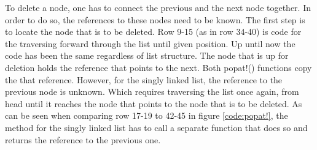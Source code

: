 \documentclass[a4paper, 11pt]{article}
\begin{document}
    To delete a node, one has to connect the previous and the next node together. In order 
    to do so, the references to these nodes need to be known. The first step is
    to locate the node that is to be deleted. Row 9-15 (as in row 34-40) is code
    for the traversing forward through the list until given position.
    Up until now the code has been the same regardless of list structure. The node that is up for deletion 
    holds the reference that points to the next. Both popat!() functions copy the that reference. 
    However, for the singly linked list, the reference to the previous node is unknown.
    Which requires traversing the list once again, from head until it reaches
    the node that points to the node that is to be deleted. As can be seen when
    comparing row 17-19 to 42-45 in figure \ref{code:popat!}, the method for the
    singly linked list has to call a separate function that does so and returns the reference to the previous one. 
\end{document}
